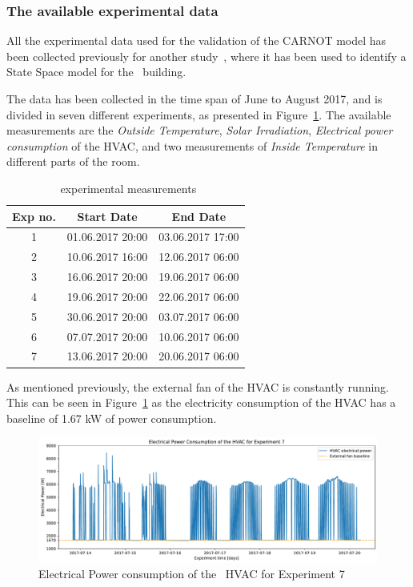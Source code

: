 \subsubsection{The available experimental data}\label{sec:CARNOT_expdata}

All the experimental data used for the validation of the CARNOT model has been
collected previously for another
study~\cite{fabiettiMultitimeScaleCoordination2018}, where it has been used to
identify a State Space model for the \pdome\ building.

The data has been collected in the time span of June to August 2017, and is
divided in seven different experiments, as presented in
Figure~\ref{tab:exp_dates}. The available measurements are the \textit{Outside
Temperature}, \textit{Solar Irradiation}, \textit{Electrical power consumption}
of the HVAC, and two measurements of \textit{Inside Temperature} in different
parts of the room.

\begin{table}[ht]
\centering
    \begin{tabular}{||c c c||}
        \hline
        Exp no. & Start Date & End Date\\
        \hline \hline
        1 & 01.06.2017 20:00 & 03.06.2017 17:00 \\
        2 & 10.06.2017 16:00 & 12.06.2017 06:00 \\
        3 & 16.06.2017 20:00 & 19.06.2017 06:00 \\
        4 & 19.06.2017 20:00 & 22.06.2017 06:00 \\
        5 & 30.06.2017 20:00 & 03.07.2017 06:00 \\
        6 & 07.07.2017 20:00 & 10.06.2017 06:00 \\
        7 & 13.06.2017 20:00 & 20.06.2017 06:00 \\
        \hline
    \end{tabular}
\caption{\pdome\ experimental measurements}
\label{tab:exp_dates}
\end{table}

\clearpage

As mentioned previously, the external fan of the HVAC is constantly running.
This can be seen in Figure~\ref{fig:Polydome_electricity} as the electricity
consumption of the HVAC has a baseline of 1.67 kW of power consumption.

\begin{figure}[ht]
    \centering
    \includegraphics[width = \textwidth]{Plots/Fan_baseline.pdf}
    \caption{Electrical Power consumption of the \pdome\ HVAC for Experiment 7}
    \label{fig:Polydome_electricity}
\end{figure}

